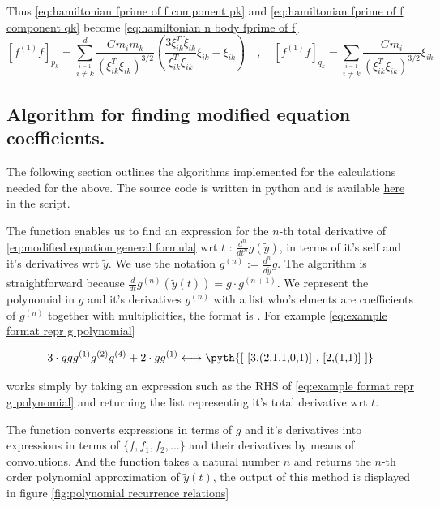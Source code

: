 \documentclass[12pt]{article}
\begin{document}
Thus \eqref{eq:hamiltonian fprime of f component pk} and \eqref{eq:hamiltonian fprime of f component qk} become \eqref{eq:hamiltonian n body fprime of f}
\begin{equation}\label{eq:hamiltonian n body fprime of f}
    \left[f^{(1)}f\right]_{p_k} = \sum_{\stackrel{i=1}{i\neq k}}^d \frac{Gm_im_k}{\left(\xi_{ik}^T\xi_{ik}\right)^{3/2}}\left( 
    \frac{3\xi_{ik}^T\dot\xi_{ik}}{\xi_{ik}^T\xi_{ik}}\xi_{ik} - \dot\xi_{ik}
    \right) \quad,\quad
    \left[ f^{(1)}f \right]_{q_k} = \sum_{\stackrel{i=1}{i\neq k}} \frac{G m_i}{\left(\xi_{ik}^T\xi_{ik}\right)^{3/2}}\xi_{ik}
\end{equation}




\subsection{Algorithm for finding modified equation coefficients.}
The following section outlines the algorithms implemented for the calculations needed for the above. The source code is written in python and is available \href{https://github.com/dcxSt/numerical_integrators/blob/master/modified_equations.py}{here} in the  script. 

The function  enables us to find an expression for the $n$-th total derivative of \eqref{eq:modified equation general formula} wrt $t$ : $\frac{d^n}{dt^n}g(\widetilde y)$, in terms of it's self and it's derivatives wrt $\widetilde y$. We use the notation $g^{(n)}:= \frac{d^n}{d{\widetilde y}}g$. The algorithm is straightforward because $\frac{d}{dt}g^{(n)}(\widetilde y(t)) = g\cdot g^{(n+1)}$. We represent the polynomial in $g$ and it's derivatives $g^{(n)}$ with a list who's elments are coefficients of $g^{(n)}$ together with multiplicities, the format is . For example \eqref{eq:example format repr g polynomial} 

\begin{equation}\label{eq:example format repr g polynomial}
    3\cdot g g g^{(1)} g^{(2)} g^{(4)} + 2\cdot g g^{(1)} \longleftrightarrow \text{\pyth{[ [3,(2,1,1,0,1)] , [2,(1,1)] ]}}
\end{equation}

 works simply by taking an expression such as the RHS of \eqref{eq:example format repr g polynomial} and returning the list representing it's total derivative wrt $t$.

The function  converts expressions in terms of $g$ and it's derivatives into expressions in terms of $\{f,f_1,f_2,...\}$ and their derivatives by means of convolutions. And the function  takes a natural number $n$ and returns the $n$-th order polynomial approximation of $\widetilde y(t)$, the output of this method is displayed in figure \ref{fig:polynomial recurrence relations}
\end{document}
